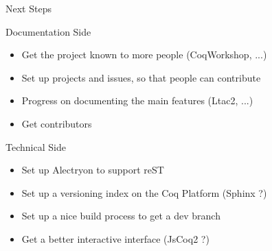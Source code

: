 \documentclass[10pt]{beamer}
\begin{document}
\begin{frame}{Next Steps}
  \begin{tcbObj}{Documentation Side}
    \begin{itemize}[label=$-$]
      \item Get the project known to more people (CoqWorkshop, ...)
      \item Set up projects and issues, so that people can contribute
      \item Progress on documenting the main features (Ltac2, ...)
      \item Get contributors
    \end{itemize}
  \end{tcbObj}
  \begin{tcbObj}{Technical Side}
    \begin{itemize}[label=$-$]
      \item Set up Alectryon to support reST
      \item Set up a versioning index on the Coq Platform (Sphinx ?)
      \item Set up a nice build process to get a dev branch
      \item Get a better interactive interface (JsCoq2 ?)
    \end{itemize}
  \end{tcbObj}
\end{frame}
\end{document}
